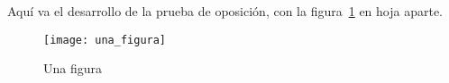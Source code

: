 \documentclass{oposicion}
\begin{document}
Aquí va el desarrollo de la prueba de oposición, con la
figura~\ref{fig:una_figura} en hoja aparte.

\begin{figure}[p]
  \centering
  \texttt{[image: una\_figura]}
  \caption{Una figura}
  \label{fig:una_figura}
\end{figure}
\end{document}
